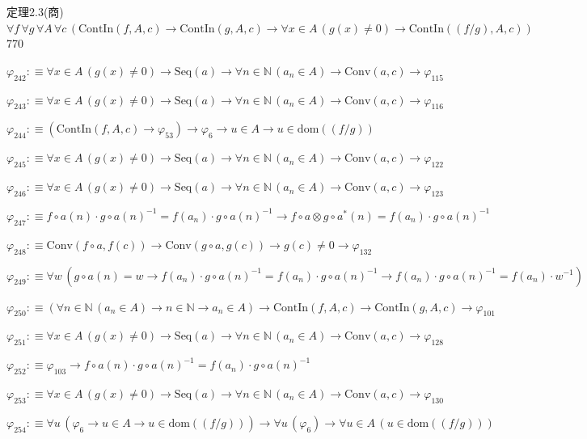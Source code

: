 \begin{fullproof}{定理2.3(商)}{$\forall f\,\forall g\,\forall A\,\forall c\,(\mathrm{ContIn}(f,A,c) \to \mathrm{ContIn}(g,A,c) \to \forall x \in A\,(g(x) \neq 0) \to \mathrm{ContIn}((f / g),A,c))$}{770}
\begin{abbrevlist}
\item $\varphi_{242} :\equiv \forall x \in A\,(g(x) \neq 0) \to \mathrm{Seq}(a) \to \forall n \in \mathbb{N}\,(a_{n} \in A) \to \mathrm{Conv}(a,c) \to \varphi_{115}$
\item $\varphi_{243} :\equiv \forall x \in A\,(g(x) \neq 0) \to \mathrm{Seq}(a) \to \forall n \in \mathbb{N}\,(a_{n} \in A) \to \mathrm{Conv}(a,c) \to \varphi_{116}$
\item $\varphi_{244} :\equiv (\mathrm{ContIn}(f,A,c) \to \varphi_{53}) \to \varphi_{6} \to u \in A \to u \in \mathrm{dom}((f / g))$
\item $\varphi_{245} :\equiv \forall x \in A\,(g(x) \neq 0) \to \mathrm{Seq}(a) \to \forall n \in \mathbb{N}\,(a_{n} \in A) \to \mathrm{Conv}(a,c) \to \varphi_{122}$
\item $\varphi_{246} :\equiv \forall x \in A\,(g(x) \neq 0) \to \mathrm{Seq}(a) \to \forall n \in \mathbb{N}\,(a_{n} \in A) \to \mathrm{Conv}(a,c) \to \varphi_{123}$
\item $\varphi_{247} :\equiv f \circ a(n) \cdot g \circ a(n)^{-1} = f(a_{n}) \cdot g \circ a(n)^{-1} \to f \circ a \otimes g \circ a^{\ast}(n) = f(a_{n}) \cdot g \circ a(n)^{-1}$
\item $\varphi_{248} :\equiv \mathrm{Conv}(f \circ a,f(c)) \to \mathrm{Conv}(g \circ a,g(c)) \to g(c) \neq 0 \to \varphi_{132}$
\item $\varphi_{249} :\equiv \forall w\,(g \circ a(n) = w \to f(a_{n}) \cdot g \circ a(n)^{-1} = f(a_{n}) \cdot g \circ a(n)^{-1} \to f(a_{n}) \cdot g \circ a(n)^{-1} = f(a_{n}) \cdot w^{-1})$
\item $\varphi_{250} :\equiv (\forall n \in \mathbb{N}\,(a_{n} \in A) \to n \in \mathbb{N} \to a_{n} \in A) \to \mathrm{ContIn}(f,A,c) \to \mathrm{ContIn}(g,A,c) \to \varphi_{101}$
\item $\varphi_{251} :\equiv \forall x \in A\,(g(x) \neq 0) \to \mathrm{Seq}(a) \to \forall n \in \mathbb{N}\,(a_{n} \in A) \to \mathrm{Conv}(a,c) \to \varphi_{128}$
\item $\varphi_{252} :\equiv \varphi_{103} \to f \circ a(n) \cdot g \circ a(n)^{-1} = f(a_{n}) \cdot g \circ a(n)^{-1}$
\item $\varphi_{253} :\equiv \forall x \in A\,(g(x) \neq 0) \to \mathrm{Seq}(a) \to \forall n \in \mathbb{N}\,(a_{n} \in A) \to \mathrm{Conv}(a,c) \to \varphi_{130}$
\item $\varphi_{254} :\equiv \forall u\,(\varphi_{6} \to u \in A \to u \in \mathrm{dom}((f / g))) \to \forall u\,(\varphi_{6}) \to \forall u \in A\,(u \in \mathrm{dom}((f / g)))$

\end{abbrevlist}
\end{fullproof}
